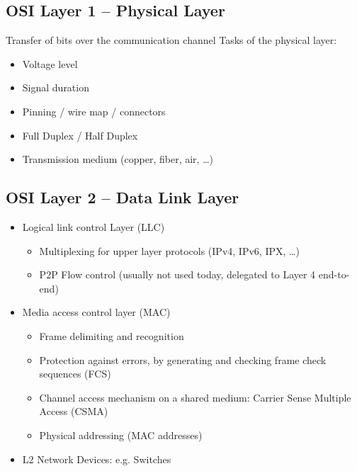 \documentclass[11pt]{article}
\begin{document}
\subsection{OSI Layer 1 – Physical Layer}
Transfer of bits over the communication channel
Tasks of the physical layer:
    \begin{itemize}
        \item Voltage level
        \item Signal duration
        \item Pinning / wire map / connectors
        \item Full Duplex / Half Duplex
        \item Transmission medium (copper, fiber, air, …)
    \end{itemize}
\subsection{OSI Layer 2 – Data Link Layer}
\begin{itemize}
    \item Logical link control Layer (LLC)
    \begin{itemize}
        \item Multiplexing for upper layer protocols (IPv4, IPv6, IPX, …)
        \item P2P Flow control (usually not used today, delegated to Layer 4 end-to-end)
    \end{itemize}
    \item Media access control layer (MAC)
    \begin{itemize}
        \item Frame delimiting and recognition
        \item Protection against errors, by generating and checking frame check sequences (FCS)
        \item Channel access mechanism on a shared medium: Carrier Sense Multiple Access (CSMA)
        \item Physical addressing (MAC addresses)
    \end{itemize}
    \item L2 Network Devices: e.g. Switches
\end{itemize}
\end{document}
